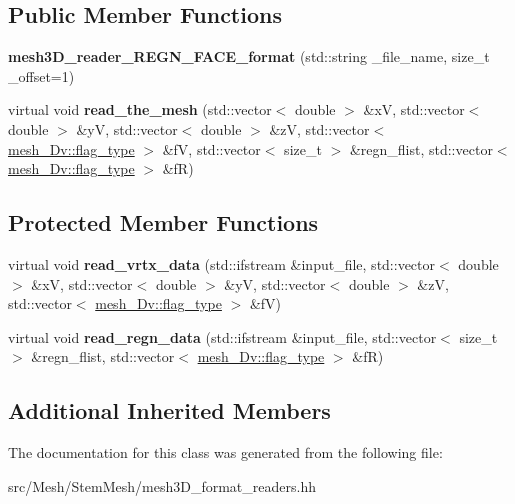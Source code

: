 \subsection*{Public Member Functions}
\begin{DoxyCompactItemize}
\item 
\mbox{\label{classStemMesh3D_1_1mesh3D__reader__REGN__FACE__format_aaa9eda98a389418706b7e1a81dce813f}} 
{\bfseries mesh3\+D\+\_\+reader\+\_\+\+R\+E\+G\+N\+\_\+\+F\+A\+C\+E\+\_\+format} (std\+::string \+\_\+file\+\_\+name, size\+\_\+t \+\_\+offset=1)
\item 
\mbox{\label{classStemMesh3D_1_1mesh3D__reader__REGN__FACE__format_ae26b342564034d6e76965c8cf34cdbd1}} 
virtual void {\bfseries read\+\_\+the\+\_\+mesh} (std\+::vector$<$ double $>$ \&xV, std\+::vector$<$ double $>$ \&yV, std\+::vector$<$ double $>$ \&zV, std\+::vector$<$ \hyperlink{classStemMesh3D_1_1mesh__3Dv_a9544cba555b60f17f04fcd1689314338}{mesh\+\_\+Dv\+::flag\+\_\+type} $>$ \&fV, std\+::vector$<$ size\+\_\+t $>$ \&regn\+\_\+flist, std\+::vector$<$ \hyperlink{classStemMesh3D_1_1mesh__3Dv_a9544cba555b60f17f04fcd1689314338}{mesh\+\_\+Dv\+::flag\+\_\+type} $>$ \&fR)
\end{DoxyCompactItemize}
\subsection*{Protected Member Functions}
\begin{DoxyCompactItemize}
\item 
\mbox{\label{classStemMesh3D_1_1mesh3D__reader__REGN__FACE__format_aee9bd0898e4e2dc06c70019e289ca60c}} 
virtual void {\bfseries read\+\_\+vrtx\+\_\+data} (std\+::ifstream \&input\+\_\+file, std\+::vector$<$ double $>$ \&xV, std\+::vector$<$ double $>$ \&yV, std\+::vector$<$ double $>$ \&zV, std\+::vector$<$ \hyperlink{classStemMesh3D_1_1mesh__3Dv_a9544cba555b60f17f04fcd1689314338}{mesh\+\_\+Dv\+::flag\+\_\+type} $>$ \&fV)
\item 
\mbox{\label{classStemMesh3D_1_1mesh3D__reader__REGN__FACE__format_a5c7cc5b38794e5f2ee56dbf1bdf3ab76}} 
virtual void {\bfseries read\+\_\+regn\+\_\+data} (std\+::ifstream \&input\+\_\+file, std\+::vector$<$ size\+\_\+t $>$ \&regn\+\_\+flist, std\+::vector$<$ \hyperlink{classStemMesh3D_1_1mesh__3Dv_a9544cba555b60f17f04fcd1689314338}{mesh\+\_\+Dv\+::flag\+\_\+type} $>$ \&fR)
\end{DoxyCompactItemize}
\subsection*{Additional Inherited Members}


The documentation for this class was generated from the following file\+:\begin{DoxyCompactItemize}
\item 
src/\+Mesh/\+Stem\+Mesh/mesh3\+D\+\_\+format\+\_\+readers.\+hh\end{DoxyCompactItemize}
